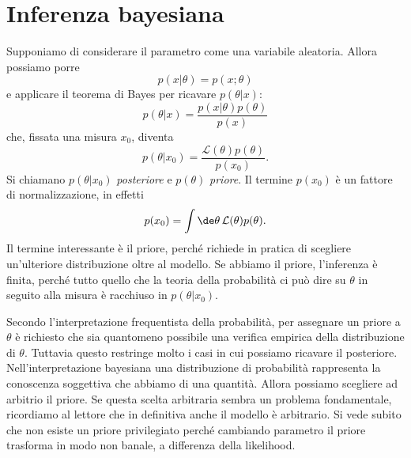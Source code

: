 \section{Inferenza bayesiana}

Supponiamo di considerare il parametro come una variabile aleatoria.
Allora possiamo porre
\begin{equation*}
	p(x|\theta) = p(x;\theta)
\end{equation*}
e applicare il teorema di Bayes per ricavare $p(\theta|x)$:
\begin{equation*}
	p(\theta|x) = \frac{p(x|\theta)p(\theta)}{p(x)}
\end{equation*}
che, fissata una misura $x_0$, diventa
\begin{equation*}
	p(\theta|x_0) = \frac{\mathcal L(\theta) p(\theta)}{p(x_0)}.
\end{equation*}
Si chiamano $p(\theta|x_0)$ \emph{posteriore} e $p(\theta)$ \emph{priore}.
Il termine $p(x_0)$ è un fattore di normalizzazione, in effetti
\begin{equation*}
	p(x_0) = \int \de \theta\, \mathcal L(\theta) p(\theta).
\end{equation*}
Il termine interessante è il priore, perché richiede in pratica di scegliere un'ulteriore distribuzione oltre al modello.
Se abbiamo il priore, l'inferenza è finita, perché tutto quello che la teoria della probabilità ci può dire su $\theta$ in seguito alla misura è racchiuso in $p(\theta|x_0)$.


Secondo l'interpretazione frequentista della probabilità,
per assegnare un priore a $\theta$ è richiesto che sia quantomeno possibile una verifica empirica della distribuzione di $\theta$.
Tuttavia questo restringe molto i casi in cui possiamo ricavare il posteriore.
Nell'interpretazione bayesiana una distribuzione di probabilità rappresenta la conoscenza soggettiva che abbiamo di una quantità.
Allora possiamo scegliere ad arbitrio il priore.
Se questa scelta arbitraria sembra un problema fondamentale,
ricordiamo al lettore che in definitiva anche il modello è arbitrario.
Si vede subito che non esiste un priore privilegiato perché cambiando parametro il priore trasforma in modo non banale, a differenza della likelihood.

